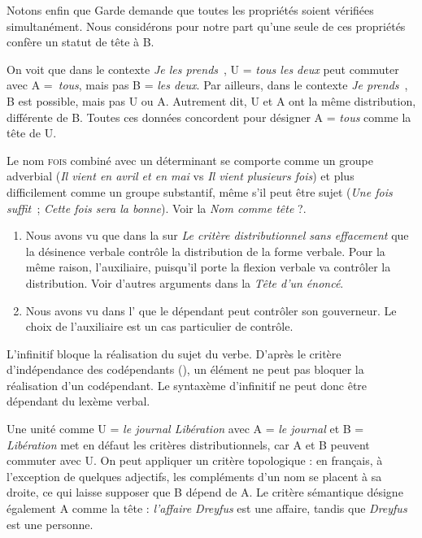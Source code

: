 {    Notons enfin que Garde demande que toutes les propriétés soient vérifiées simultanément. Nous considérons pour notre part qu’une seule de ces propriétés confère un statut de tête à B.


     On voit que dans le contexte \textit{Je les prends}~{\longrule}, U = \textit{tous les deux} peut commuter avec A =~\textit{tous}, mais pas B = \textit{les deux}. Par ailleurs, dans le contexte \textit{Je prends}~{\longrule}, B est possible, mais pas U ou A. Autrement dit, U et A ont la même distribution, différente de B. Toutes ces données concordent pour désigner A = \textit{tous} comme la tête de U.

     Le nom \textsc{fois} combiné avec un déterminant se comporte comme un groupe adverbial (\textit{Il vient en avril et en mai} vs \textit{Il vient plusieurs fois}) et plus difficilement comme un groupe substantif, même s’il peut être sujet (\textit{Une fois suffit~}; \textit{Cette fois sera la bonne}). Voir la  \textit{Nom comme tête} ?.

    \begin{enumerate}[label=\alph*.]
    \item Nous avons vu que dans la  sur \textit{Le critère distributionnel sans effacement} que la désinence verbale contrôle la distribution de la forme verbale. Pour la même raison, l’auxiliaire, puisqu’il porte la flexion verbale va contrôler la distribution. Voir d’autres arguments dans la  \textit{Tête d’un énoncé}.

    \item Nous avons vu dans l' que le dépendant peut contrôler son gouverneur. Le choix de l’auxiliaire est un cas particulier de contrôle.
    \end{enumerate}

     L’infinitif bloque la réalisation du sujet du verbe. D’après le critère d’indépendance des codépendants (), un élément ne peut pas bloquer la réalisation d’un codépendant. Le syntaxème d’infinitif ne peut donc être dépendant du lexème verbal.

     Une unité comme U = \textit{le journal Libération} avec A = \textit{le journal} et B = \textit{Libération} met en défaut les critères distributionnels, car A et B peuvent commuter avec U. On peut appliquer un critère topologique : en français, à l’exception de quelques adjectifs, les compléments d’un nom se placent à sa droite, ce qui laisse supposer que B dépend de A. Le critère sémantique désigne également A comme la tête : \textit{l’affaire Dreyfus} est une affaire, tandis que \textit{Dreyfus} est une personne.

}
